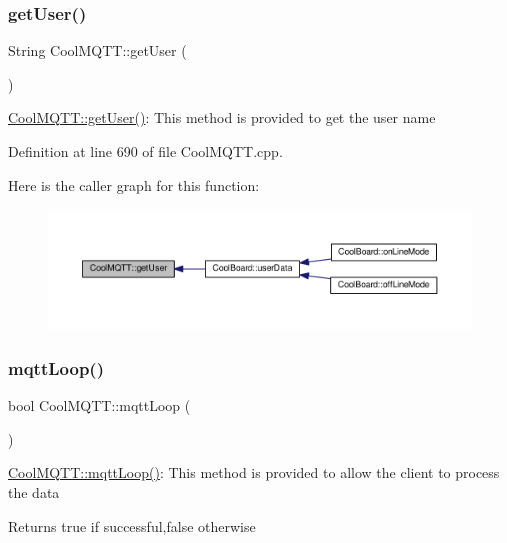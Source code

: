 \subsubsection{\texorpdfstring{get\+User()}{getUser()}}
{\footnotesize\ttfamily String Cool\+M\+Q\+T\+T\+::get\+User (\begin{DoxyParamCaption}{ }\end{DoxyParamCaption})}

\hyperlink{class_cool_m_q_t_t_a373cc92fca7760d886f02d8a6e5b3f63}{Cool\+M\+Q\+T\+T\+::get\+User()}\+: This method is provided to get the user name 

Definition at line 690 of file Cool\+M\+Q\+T\+T.\+cpp.

Here is the caller graph for this function\+:
\nopagebreak
\begin{figure}[H]
\begin{center}
\leavevmode
\includegraphics[width=350pt]{class_cool_m_q_t_t_a373cc92fca7760d886f02d8a6e5b3f63_icgraph}
\end{center}
\end{figure}
\mbox{\label{class_cool_m_q_t_t_aa5eaae967b562b62cbcf2b8d81f6e5d5}} 
\subsubsection{\texorpdfstring{mqtt\+Loop()}{mqttLoop()}}
{\footnotesize\ttfamily bool Cool\+M\+Q\+T\+T\+::mqtt\+Loop (\begin{DoxyParamCaption}{ }\end{DoxyParamCaption})}

\hyperlink{class_cool_m_q_t_t_aa5eaae967b562b62cbcf2b8d81f6e5d5}{Cool\+M\+Q\+T\+T\+::mqtt\+Loop()}\+: This method is provided to allow the client to process the data

\begin{DoxyReturn}{Returns}
true if successful,false otherwise 
\end{DoxyReturn}


